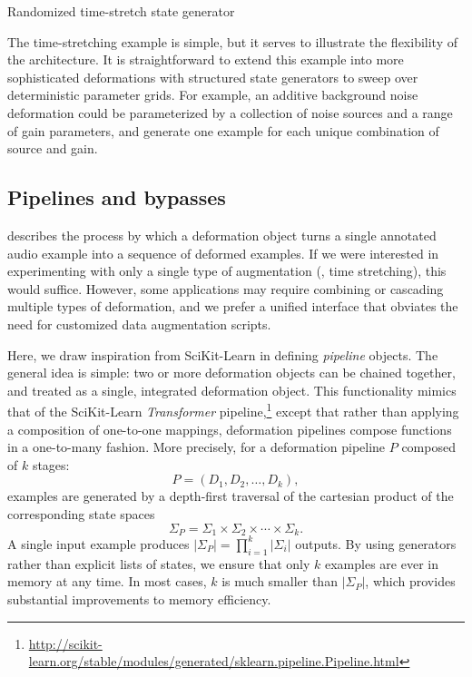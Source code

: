 \documentclass{article}
\begin{document}
\begin{algorithm}[t]
    \caption{Randomized time-stretch state generator\label{alg:timestate}}
    \begin{algorithmic}[1]
            \EndFor{}
        \EndFunction{}
    \end{algorithmic}
\end{algorithm}

The time-stretching example is simple, but it serves to illustrate the flexibility of 
the architecture.
It is straightforward to extend this example into more sophisticated deformations 
with structured state generators to sweep over deterministic parameter grids.
For example, an additive background noise deformation could be parameterized by 
a collection of noise sources and a range of gain parameters, and 
generate one example for each unique combination of source and gain.

\subsection{Pipelines and bypasses}
 describes the process by which a deformation object turns a
single annotated audio example into a sequence of deformed examples.  If we were
interested in experimenting with only a single type of augmentation (\eg, time stretching),
this would suffice.  However, some applications may require combining or cascading
multiple types of deformation, and we prefer a unified interface that obviates the
need for customized data augmentation scripts.

Here, we draw inspiration from SciKit-Learn in defining \emph{pipeline}
objects.  The general idea is simple: two or more deformation objects can be chained
together, and treated as a single, integrated deformation object.  This functionality
mimics that of the SciKit-Learn \emph{Transformer} pipeline,\footnote{\url{http://scikit-learn.org/stable/modules/generated/sklearn.pipeline.Pipeline.html}} except that rather
than applying a composition of one-to-one mappings, deformation pipelines
compose functions in a one-to-many fashion.  More precisely, for a deformation pipeline
$P$ composed of $k$ stages:
\[
P = (D_1, D_2, \dots, D_k),
\]examples are generated by a depth-first traversal of the
cartesian product of the corresponding state spaces
\[
\Sigma_P = \Sigma_1 \times \Sigma_2 \times \cdots \times \Sigma_k.
\]
A single input example produces $|\Sigma_P|=\prod_{i=1}^k |\Sigma_i|$ outputs.
By using generators rather than explicit lists of states, 
we ensure that only $k$ examples are ever in memory at any time.
In most cases, $k$ is much smaller than $|\Sigma_P|$, which provides substantial
improvements to memory efficiency.
\end{document}
